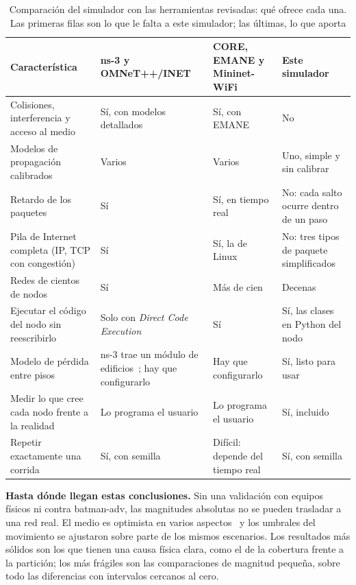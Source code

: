 \begin{table}[htbp!]
    \centering
    \caption{Comparación del simulador con las herramientas revisadas: qué ofrece cada una. Las primeras filas son lo que le falta a este simulador; las últimas, lo que aporta}
    \label{tab:faltantes}
    \footnotesize
    \begin{tabular}{|p{4.3cm}|p{2.6cm}|p{2.9cm}|p{3.3cm}|}
        \hline
        \textbf{Característica} & \textbf{ns-3 y OMNeT++/INET} & \textbf{CORE, EMANE y Mininet-WiFi} & \textbf{Este simulador} \\
        \hline
        Colisiones, interferencia y acceso al medio & Sí, con modelos detallados~\cite{Ns3Modelos,InetFramework} & Sí, con EMANE~\cite{Emane} & No \\
        \hline
        Modelos de propagación calibrados & Varios~\cite{Ns3Modelos} & Varios~\cite{Emane} & Uno, simple y sin calibrar \\
        \hline
        Retardo de los paquetes & Sí & Sí, en tiempo real & No: cada salto ocurre dentro de un paso \\
        \hline
        Pila de Internet completa (IP, TCP con congestión) & Sí~\cite{InetFramework} & Sí, la de Linux~\cite{Ahrenholz2008Core,Fontes2015MininetWifi} & No: tres tipos de paquete simplificados \\
        \hline
        Redes de cientos de nodos & Sí & Más de cien~\cite{Ahrenholz2008Core} & Decenas \\
        \hline
        Ejecutar el código del nodo sin reescribirlo & Solo con \textit{Direct Code Execution}~\cite{Tazaki2013DCE} & Sí & Sí, las clases en Python del nodo \\
        \hline
        Modelo de pérdida entre pisos & ns-3 trae un módulo de edificios~\cite{Ns3Modelos}; hay que configurarlo & Hay que configurarlo & Sí, listo para usar \\
        \hline
        Medir lo que cree cada nodo frente a la realidad & Lo programa el usuario & Lo programa el usuario & Sí, incluido \\
        \hline
        Repetir exactamente una corrida & Sí, con semilla & Difícil: depende del tiempo real & Sí, con semilla \\
        \hline
    \end{tabular}
\end{table}

\textbf{Hasta dónde llegan estas conclusiones.} Sin una validación con equipos
físicos ni contra batman-adv, las magnitudes absolutas no se pueden trasladar a
una red real. El medio es optimista en varios
aspectos~\cite{Kotz2004Assumptions} y los umbrales del movimiento se ajustaron
sobre parte de los mismos escenarios. Los resultados más sólidos son los que
tienen una causa física clara, como el de la cobertura frente a la partición;
los más frágiles son las comparaciones de magnitud pequeña, sobre todo las
diferencias con intervalos cercanos al cero.
